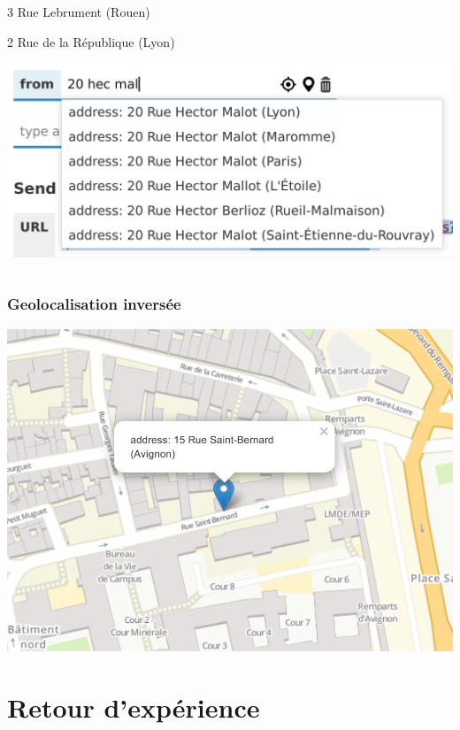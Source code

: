 \documentclass[table]{beamer}
\begin{document}
\begin{frame}
\begin{columns}
\begin{column}{.5\linewidth}
\begin{block}{\strut 3 Rue Lebrument (Rouen)}
      \end{block}
      \begin{block}{\strut 2 Rue de la République (Lyon)}
        \includegraphics[width=\textwidth]{images/autocomplete-20-hec-mal-lyon}
      \end{block}
    \end{column}
  \end{columns}
\end{frame}

\begin{frame}
  \frametitle{Geolocalisation inversée}

  \centering
  \includegraphics[width=.8\linewidth]{images/reverse-geocoding}
\end{frame}

\section{Retour d'expérience}
\end{document}
